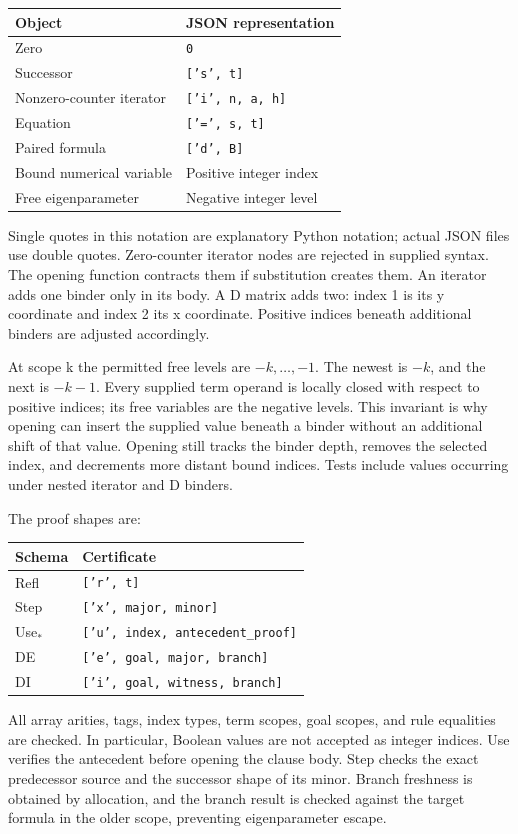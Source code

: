 \documentclass[11pt,letterpaper]{article}
\theoremstyle{definition}
\begin{document}
\begin{center}
\begin{tabular}{ll}
\toprule
Object & JSON representation\\
\midrule
Zero & \texttt{0}\\
Successor & \texttt{['s', t]}\\
Nonzero-counter iterator & \texttt{['i', n, a, h]}\\
Equation & \texttt{['=', s, t]}\\
Paired formula & \texttt{['d', B]}\\
Bound numerical variable & Positive integer index\\
Free eigenparameter & Negative integer level\\
\bottomrule
\end{tabular}
\end{center}
Single quotes in this notation are explanatory Python notation; actual
JSON files use double quotes. Zero-counter iterator nodes are rejected
in supplied syntax. The opening function contracts them if substitution
creates them. An iterator adds one binder only in its body. A D matrix
adds two: index 1 is its y coordinate and index 2 its x coordinate.
Positive indices beneath additional binders are adjusted accordingly.

At scope k the permitted free levels are \(-k,\ldots,-1\).
The newest is \(-k\), and the next is \(-k-1\). Every supplied term
operand is locally closed with respect to positive indices; its free
variables are the negative levels. This invariant is why opening can
insert the supplied value beneath a binder without an additional shift
of that value. Opening still tracks the binder depth, removes the selected
index, and decrements more distant bound indices. Tests include values
occurring under nested iterator and D binders.

The proof shapes are:
\begin{center}
\begin{tabular}{ll}
\toprule
Schema & Certificate\\
\midrule
Refl & \texttt{['r', t]}\\
Step & \texttt{['x', major, minor]}\\
Use$_*$ & \texttt{['u', index, antecedent\_proof]}\\
DE & \texttt{['e', goal, major, branch]}\\
DI & \texttt{['i', goal, witness, branch]}\\
\bottomrule
\end{tabular}
\end{center}
All array arities, tags, index types, term scopes, goal scopes, and rule
equalities are checked. In particular, Boolean values are not accepted
as integer indices. Use verifies the antecedent before opening the
clause body. Step checks the exact predecessor source and the successor
shape of its minor. Branch freshness is obtained by allocation, and
the branch result is checked against the target formula in the older
scope, preventing eigenparameter escape.
\end{document}
